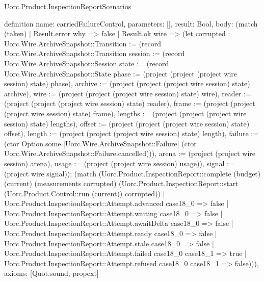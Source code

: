 \begin{lexlean}{Uorc.Product.InspectionReportScenarios}
\begin{semanticmodule}
definition{
  name: carriedFailureControl,
  parameters: [],
  result: Bool,
  body: (match (taken)
    | Result.error why => false
    | Result.ok wire => (let corrupted : Uorc.Wire.ArchiveSnapshot::Transition := (record Uorc.Wire.ArchiveSnapshot::Transition {session := (record Uorc.Wire.ArchiveSnapshot::Session {state := (record Uorc.Wire.ArchiveSnapshot::State {phase := (project (project (project wire session) state) phase), archive := (project (project (project wire session) state) archive), wire := (project (project (project wire session) state) wire), reader := (project (project (project wire session) state) reader), frame := (project (project (project wire session) state) frame), lengths := (project (project (project wire session) state) lengths), offset := (project (project (project wire session) state) offset), length := (project (project (project wire session) state) length), failure := (ctor Option.some [Uorc.Wire.ArchiveSnapshot::Failure] (ctor Uorc.Wire.ArchiveSnapshot::Failure.cancelled))}), arena := (project (project wire session) arena), usage := (project (project wire session) usage)}), signal := (project wire signal)}); (match (Uorc.Product.InspectionReport::complete (budget) (current) (measurements corrupted) (Uorc.Product.InspectionReport::start (Uorc.Product.Control::run (current)) corrupted))
      | Uorc.Product.InspectionReport::Attempt.advanced case18_0 => false
      | Uorc.Product.InspectionReport::Attempt.waiting case18_0 => false
      | Uorc.Product.InspectionReport::Attempt.awaitDelta case18_0 => false
      | Uorc.Product.InspectionReport::Attempt.ready case18_0 => false
      | Uorc.Product.InspectionReport::Attempt.stale case18_0 => false
      | Uorc.Product.InspectionReport::Attempt.failed case18_0 case18_1 => true
      | Uorc.Product.InspectionReport::Attempt.refused case18_0 case18_1 => false))),
  axioms: [Quot.sound, propext]
}


\end{semanticmodule}
\end{lexlean}
